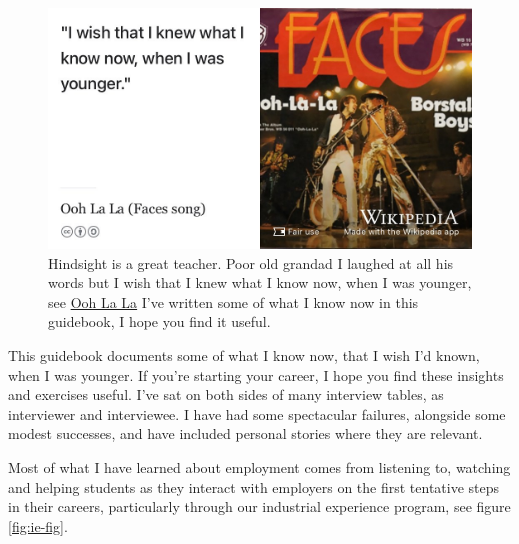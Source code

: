 \documentclass[
]{book}
\begin{document}
\begin{figure}

{\centering \includegraphics[width=0.99\linewidth]{images/faces} 

}

\caption{Hindsight is a great teacher. Poor old grandad I laughed at all his words but I wish that I knew what I know now, when I was younger, see \href{https://en.wikipedia.org/wiki/Ooh_La_La_(Faces_song)}{Ooh La La} \citep{faces} I've written some of what I know now in this guidebook, I hope you find it useful.}\label{fig:faces-fig}
\end{figure}



This guidebook documents some of what I know now, that I wish I'd known, when I was younger. If you're starting your career, I hope you find these insights and exercises useful. I've sat on both sides of many interview tables, as interviewer and interviewee. I have had some spectacular failures, alongside some modest successes, and have included personal stories where they are relevant.

Most of what I have learned about employment comes from listening to, watching and helping students as they interact with employers on the first tentative steps in their careers, particularly through our industrial experience program, see figure \ref{fig:ie-fig}.
\end{document}
